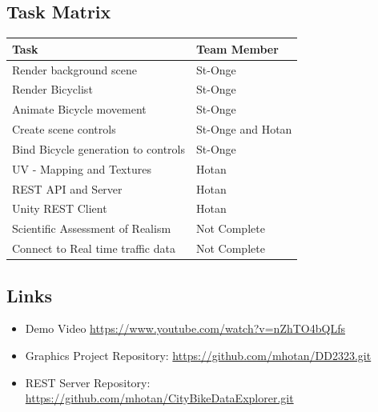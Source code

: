 \documentclass{scrartcl}
\begin{document}
        \subsection{Task Matrix}
        \begin{center}
   		\begin{tabular}{ | l | p{5cm} |}
    		\hline
		Task & Team Member  \\ \hline
    		Render background scene & St-Onge \\ \hline
		Render Bicyclist & St-Onge \\ \hline
		Animate Bicycle movement & St-Onge \\ \hline
    		Create scene controls & St-Onge and Hotan \\ \hline
		Bind Bicycle generation to controls & St-Onge \\ \hline
		UV - Mapping and Textures & Hotan \\ \hline
		REST API and Server & Hotan \\ \hline	
		Unity REST Client & Hotan \\ \hline
		Scientific Assessment of Realism & Not Complete \\ \hline	
		Connect to Real time traffic data & Not Complete \\ \hline														
		\end{tabular}
	\end{center}
        
        \subsection{Links}
           
	\begin{itemize}
		\item Demo Video \url{https://www.youtube.com/watch?v=nZhTO4bQLfs}
  		\item Graphics Project Repository: \url{https://github.com/mhotan/DD2323.git}
  		\item REST Server Repository: \url{https://github.com/mhotan/CityBikeDataExplorer.git}
	\end{itemize} 



\end{document}
